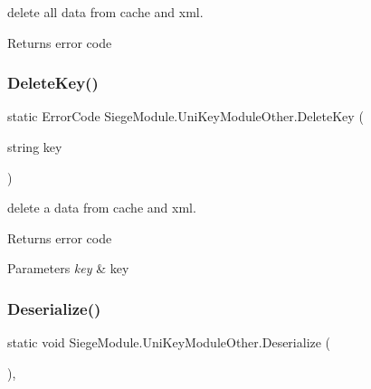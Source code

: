 delete all data from cache and xml. 

\begin{DoxyReturn}{Returns}
error code
\end{DoxyReturn}
\mbox{\label{class_siege_module_1_1_uni_key_module_other_a273d7ae437e207ed153e5233e0887297}} 
\subsubsection{\texorpdfstring{Delete\+Key()}{DeleteKey()}}
{\footnotesize\ttfamily static Error\+Code Siege\+Module.\+Uni\+Key\+Module\+Other.\+Delete\+Key (\begin{DoxyParamCaption}\item[{string}]{key }\end{DoxyParamCaption})\hspace{0.3cm}{\ttfamily [static]}}



delete a data from cache and xml. 

\begin{DoxyReturn}{Returns}
error code
\end{DoxyReturn}

\begin{DoxyParams}{Parameters}
{\em key} & key\\
\hline
\end{DoxyParams}
\mbox{\label{class_siege_module_1_1_uni_key_module_other_a705e91fd483e35dee3dca4328ec1c939}} 
\subsubsection{\texorpdfstring{Deserialize()}{Deserialize()}}
{\footnotesize\ttfamily static void Siege\+Module.\+Uni\+Key\+Module\+Other.\+Deserialize (\begin{DoxyParamCaption}{ }\end{DoxyParamCaption})\hspace{0.3cm}{\ttfamily [static]}, {\ttfamily [private]}}



